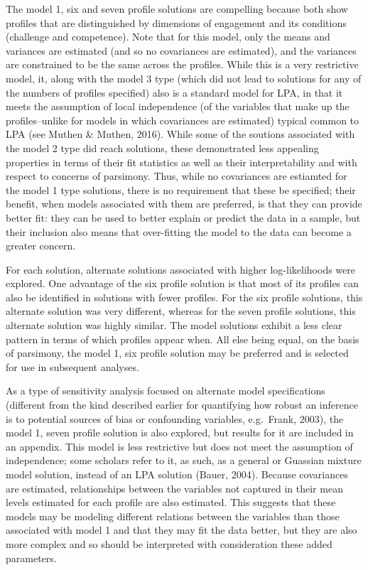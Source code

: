 \documentclass[]{msu-thesis}
\theoremstyle{definition}
\theoremstyle{definition}
\theoremstyle{definition}
\theoremstyle{remark}
\begin{document}
The model 1, six and seven profile solutions are compelling because both
show profiles that are distinguished by dimensions of engagement and its
conditions (challenge and competence). Note that for this model, only
the means and variances are estimated (and so no covariances are
estimated), and the variances are constrained to be the same across the
profiles. While this is a very restrictive model, it, along with the
model 3 type (which did not lead to solutions for any of the numbers of
profiles specified) also is a standard model for LPA, in that it meets
the assumption of local independence (of the variables that make up the
profiles--unlike for models in which covariances are estimated) typical
common to LPA (see Muthen \& Muthen, 2016). While some of the soutions
associated with the model 2 type did reach solutions, these demonstrated
less appealing properties in terms of their fit statistics as well as
their interpretability and with respect to concerns of parsimony. Thus,
while no covariances are estiamted for the model 1 type solutions, there
is no requirement that these be specified; their benefit, when models
associated with them are preferred, is that they can provide better fit:
they can be used to better explain or predict the data in a sample, but
their inclusion also means that over-fitting the model to the data can
become a greater concern.

For each solution, alternate solutions associated with higher
log-likelihoods were explored. One advantage of the six profile solution
is that most of its profiles can also be identified in solutions with
fewer profiles. For the six profile solutions, this alternate solution
was very different, whereas for the seven profile solutions, this
alternate solution was highly similar. The model solutions exhibit a
less clear pattern in terms of which profiles appear when. All else
being equal, on the basis of parsimony, the model 1, six profile
solution may be preferred and is selected for use in subsequent
analyses.

As a type of sensitivity analysis focused on alternate model
specifications (different from the kind described earlier for
quantifying how robust an inference is to potential sources of bias or
confounding variables, e.g.~Frank, 2003), the model 1, seven profile
solution is also explored, but results for it are included in an
appendix. This model is less restrictive but does not meet the
assumption of independence; some scholars refer to it, as such, as a
general or Guassian mixture model solution, instead of an LPA solution
(Bauer, 2004). Because covariances are estimated, relationships between
the variables not captured in their mean levels estimated for each
profile are also estimated. This suggests that these models may be
modeling different relations between the variables than those associated
with model 1 and that they may fit the data better, but they are also
more complex and so should be interpreted with consideration these added
parameters.
\end{document}
